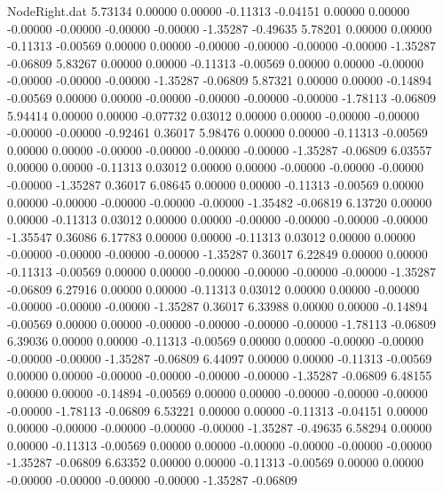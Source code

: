 \begin{filecontents}{NodeRight.dat}
   5.73134    0.00000    0.00000    -0.11313   -0.04151    0.00000    0.00000   -0.00000   -0.00000   -0.00000   -0.00000   -1.35287   -0.49635
   5.78201    0.00000    0.00000    -0.11313   -0.00569    0.00000    0.00000   -0.00000   -0.00000   -0.00000   -0.00000   -1.35287   -0.06809
   5.83267    0.00000    0.00000    -0.11313   -0.00569    0.00000    0.00000   -0.00000   -0.00000   -0.00000   -0.00000   -1.35287   -0.06809
   5.87321    0.00000    0.00000    -0.14894   -0.00569    0.00000    0.00000   -0.00000   -0.00000   -0.00000   -0.00000   -1.78113   -0.06809
   5.94414    0.00000    0.00000    -0.07732    0.03012    0.00000    0.00000   -0.00000   -0.00000   -0.00000   -0.00000   -0.92461    0.36017
   5.98476    0.00000    0.00000    -0.11313   -0.00569    0.00000    0.00000   -0.00000   -0.00000   -0.00000   -0.00000   -1.35287   -0.06809
   6.03557    0.00000    0.00000    -0.11313    0.03012    0.00000    0.00000   -0.00000   -0.00000   -0.00000   -0.00000   -1.35287    0.36017
   6.08645    0.00000    0.00000    -0.11313   -0.00569    0.00000    0.00000   -0.00000   -0.00000   -0.00000   -0.00000   -1.35482   -0.06819
   6.13720    0.00000    0.00000    -0.11313    0.03012    0.00000    0.00000   -0.00000   -0.00000   -0.00000   -0.00000   -1.35547    0.36086
   6.17783    0.00000    0.00000    -0.11313    0.03012    0.00000    0.00000   -0.00000   -0.00000   -0.00000   -0.00000   -1.35287    0.36017
   6.22849    0.00000    0.00000    -0.11313   -0.00569    0.00000    0.00000   -0.00000   -0.00000   -0.00000   -0.00000   -1.35287   -0.06809
   6.27916    0.00000    0.00000    -0.11313    0.03012    0.00000    0.00000   -0.00000   -0.00000   -0.00000   -0.00000   -1.35287    0.36017
   6.33988    0.00000    0.00000    -0.14894   -0.00569    0.00000    0.00000   -0.00000   -0.00000   -0.00000   -0.00000   -1.78113   -0.06809
   6.39036    0.00000    0.00000    -0.11313   -0.00569    0.00000    0.00000   -0.00000   -0.00000   -0.00000   -0.00000   -1.35287   -0.06809
   6.44097    0.00000    0.00000    -0.11313   -0.00569    0.00000    0.00000   -0.00000   -0.00000   -0.00000   -0.00000   -1.35287   -0.06809
   6.48155    0.00000    0.00000    -0.14894   -0.00569    0.00000    0.00000   -0.00000   -0.00000   -0.00000   -0.00000   -1.78113   -0.06809
   6.53221    0.00000    0.00000    -0.11313   -0.04151    0.00000    0.00000   -0.00000   -0.00000   -0.00000   -0.00000   -1.35287   -0.49635
   6.58294    0.00000    0.00000    -0.11313   -0.00569    0.00000    0.00000   -0.00000   -0.00000   -0.00000   -0.00000   -1.35287   -0.06809
   6.63352    0.00000    0.00000    -0.11313   -0.00569    0.00000    0.00000   -0.00000   -0.00000   -0.00000   -0.00000   -1.35287   -0.06809

\end{filecontents}
